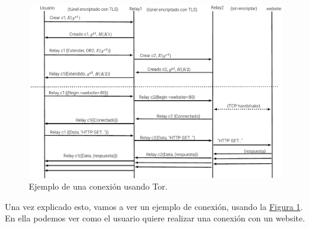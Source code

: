 \documentclass[10pt,a4paper,spanish]{article}
\begin{document}
\begin{figure}[!h]
    \centering
    \includegraphics[width=1\textwidth]{comunicaciones}
    \caption{Ejemplo de una conexión usando Tor.}
    \label{comunicaciones}
\end{figure}

Una vez explicado esto, vamos a ver un ejemplo de conexión, usando la \hyperref[comunicaciones]{Figura \ref*{comunicaciones}}. En ella podemos ver como el usuario quiere realizar una conexión con un website.
\end{document}
